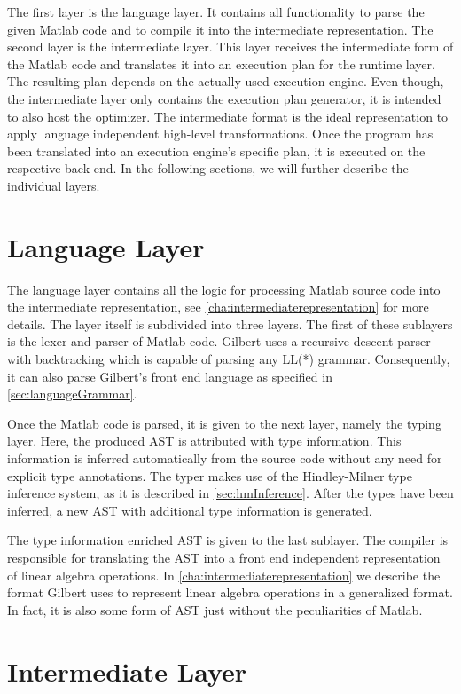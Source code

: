 The first layer is the language layer.
It contains all functionality to parse the given Matlab code and to compile it into the intermediate representation.
The second layer is the intermediate layer.
This layer receives the intermediate form of the Matlab code and translates it into an execution plan for the runtime layer.
The resulting plan depends on the actually used execution engine.
Even though, the intermediate layer only contains the execution plan generator, it is intended to also host the optimizer.
The intermediate format is the ideal representation to apply language independent high-level transformations.
Once the program has been translated into an execution engine's specific plan, it is executed on the respective back end.
In the following sections, we will further describe the individual layers.

\section{Language Layer}

The language layer contains all the logic for processing Matlab source code into the intermediate representation, see \cref{cha:intermediaterepresentation} for more details.
The layer itself is subdivided into three layers.
The first of these sublayers is the lexer and parser of Matlab code.
Gilbert uses a recursive descent parser with backtracking which is capable of parsing any LL(*) grammar.
Consequently, it can also parse Gilbert's front end language as specified in \cref{sec:languageGrammar}.

Once the Matlab code is parsed, it is given to the next layer, namely the typing layer.
Here, the produced AST is attributed with type information.
This information is inferred automatically from the source code without any need for explicit type annotations.
The typer makes use of the Hindley-Milner type inference system, as it is described in \cref{sec:hmInference}.
After the types have been inferred, a new AST with additional type information is generated.

The type information enriched AST is given to the last sublayer.
The compiler is responsible for translating the AST into a front end independent representation of linear algebra operations.
In \cref{cha:intermediaterepresentation} we describe the format Gilbert uses to represent linear algebra operations in a generalized format.
In fact, it is also some form of AST just without the peculiarities of Matlab.

\section{Intermediate Layer}

